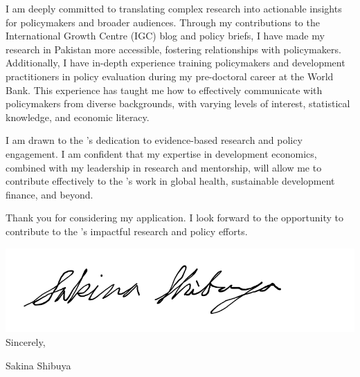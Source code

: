\documentclass[12pt]{letter}
\begin{document}
I am deeply committed to translating complex research into actionable insights for policymakers and broader audiences. 
Through my contributions to the International Growth Centre (IGC) blog and policy briefs, I have made my research in Pakistan more accessible, 
fostering relationships with policymakers. Additionally, I have in-depth experience training policymakers and development practitioners 
in policy evaluation during my pre-doctoral career at the World Bank. This experience has taught me how to effectively communicate 
with policymakers from diverse backgrounds, with varying levels of interest, statistical knowledge, and economic literacy.

I am drawn to the \instName's dedication to evidence-based research and policy engagement. I am confident that my expertise 
in development economics, combined with my leadership in research and mentorship, will allow me to contribute effectively 
to the \instName's work in global health, sustainable development finance, and beyond.

Thank you for considering my application. I look forward to the opportunity to contribute to the \instName's 
impactful research and policy efforts.

\bigskip

\includegraphics[height=4\baselineskip]{signature.png}  \\

\vspace*{-6.5\baselineskip}Sincerely, 

\vspace{2.5\baselineskip}Sakina Shibuya
\end{document}
